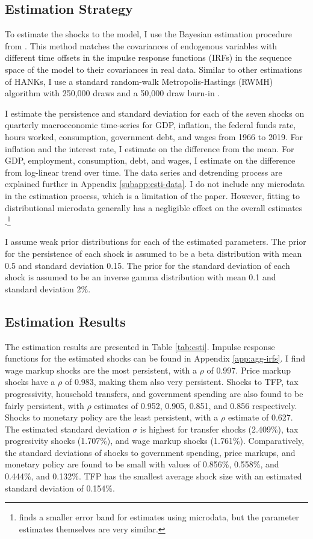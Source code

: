 \subsection{Estimation Strategy}

To estimate the shocks to the model, I use the Bayesian estimation procedure from \textcite{auclert2021using}. This method matches the covariances of endogenous variables with different time offsets in the impulse response functions (IRFs) in the sequence space of the model to their covariances in real data. Similar to other estimations of HANKs, I use a standard random-walk Metropolis-Hastings (RWMH) algorithm with 250,000 draws and a 50,000 draw burn-in \autocites{auclert2021using}{bayer2024shocks}.

I estimate the persistence and standard deviation for each of the seven shocks on quarterly macroeconomic time-series for GDP, inflation, the federal funds rate, hours worked, consumption, government debt, and wages from 1966 to 2019. For inflation and the interest rate, I estimate on the difference from the mean. For GDP, employment, consumption, debt, and wages, I estimate on the difference from log-linear trend over time. The data series and detrending process are explained further in Appendix \ref{subapp:esti-data}. I do not include any microdata in the estimation process, which is a limitation of the paper. However, fitting to distributional microdata generally has a negligible effect on the overall estimates \autocite{bayer2024shocks}.\footnote{\textcite{iao2024estimating} finds a smaller error band for estimates using microdata, but the parameter estimates themselves are very similar.}

I assume weak prior distributions for each of the estimated parameters. The prior for the persistence of each shock is assumed to be a beta distribution with mean 0.5 and standard deviation 0.15. The prior for the standard deviation of each shock is assumed to be an inverse gamma distribution with mean 0.1 and standard deviation 2\%.


\subsection{Estimation Results}

The estimation results are presented in Table \ref{tab:esti}. Impulse response functions for the estimated shocks can be found in Appendix \ref{app:agg-irfs}. I find wage markup shocks are the most persistent, with a $\rho$ of 0.997. Price markup shocks have a $\rho$ of 0.983, making them also very persistent. Shocks to TFP, tax progressivity, household transfers, and government spending are also found to be fairly persistent, with $\rho$ estimates of 0.952, 0.905, 0.851, and 0.856 respectively. Shocks to monetary policy are the least persistent, with a $\rho$ estimate of 0.627. The estimated standard deviation $\sigma$ is highest for transfer shocks (2.409\%), tax progresivity shocks (1.707\%), and wage markup shocks (1.761\%). Comparatively, the standard deviations of shocks to government spending, price markups, and monetary policy are found to be small with values of 0.856\%, 0.558\%, and 0.444\%, and 0.132\%. TFP has the smallest average shock size with an estimated standard deviation of 0.154\%.

